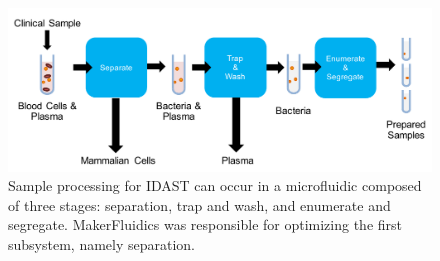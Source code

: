 \begin{figure}[H]
  \begin{minipage}[t]{0.99\linewidth}\centering
    \includegraphics[width=13cm]{idastUfFlow.pdf}
    \medskip
  \end{minipage}\hfill
  \caption[Block diagram of IDAST sample processing via microfluidics]{Sample processing for IDAST can occur in a microfluidic composed of three stages: separation, trap and wash, and enumerate and segregate. MakerFluidics was responsible for optimizing the first subsystem, namely separation.}
    \label{fig:idastUfFlow}
\end{figure}
